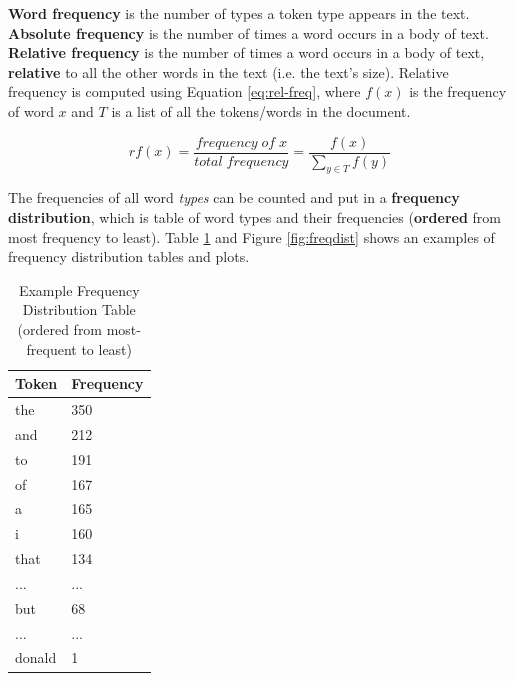 \documentclass{article}
\begin{document}
\textbf{Word frequency} is the number of types a token type appears in the text. \textbf{Absolute frequency} is the number of times a word occurs in a body of text. \textbf{Relative frequency} is the number of times a word occurs in a body of text, \textbf{relative} to all the other words in the text (i.e. the text's size). Relative frequency is computed using Equation \ref{eq:rel-freq}, where $f(x)$ is the frequency of word $x$ and $T$ is a list of all the tokens/words in the document.

\begin{equation}
	rf(x) = \frac{frequency\;of\;x}{total\;frequency} =
	\frac{f(x)}{ \sum_{y \in T} {f(y)} }
	\label{eq:rel-freq}
\end{equation}

The frequencies of all word \textit{types} can be counted and put in a \textbf{frequency distribution}, which is table of word types and their frequencies (\textbf{ordered} from most frequency to least). Table \ref{tab:freqdist} and Figure \ref{fig:freqdist} shows an examples of frequency distribution tables and plots.

\begin{table}
	\centering
	\begin{tabular}{|l|l|}
		\hline
		\textbf{Token} & \textbf{Frequency} \\
		\hline
		the & 350 \\
		and & 212 \\
		to & 191 \\
		of & 167 \\
		a & 165 \\
		i & 160 \\
		that & 134 \\
		... & ...\\
		but & 68 \\
		... & ...\\
		donald & 1 \\
		\hline
	\end{tabular}
	\caption{Example Frequency Distribution Table (ordered from most-frequent to least)}
	\label{tab:freqdist}
\end{table}
\end{document}
